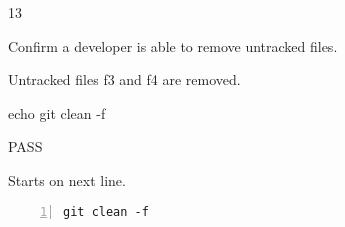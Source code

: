 \begin{description}[align=right,leftmargin=3.2cm,labelindent=3.0cm]
\item[Step:] 13
\item[Confirm:] Confirm a developer is able to remove untracked files.
\item[Expectation:] Untracked files f3 and f4 are removed.
\item[Command:] echo git  clean -f
\item[Test Result:] PASS
\item[Evidence:] Starts on next line.
\end{description}
\begin{lstlisting}[numbers=left]
git clean -f

\end{lstlisting}
